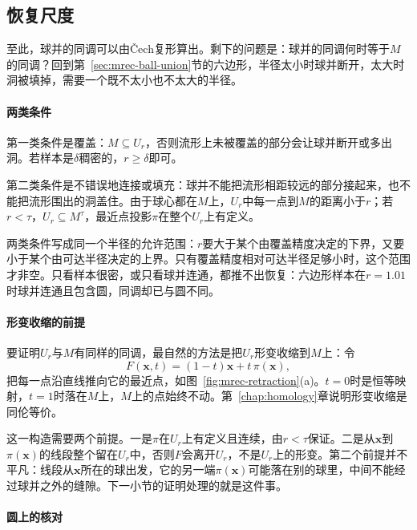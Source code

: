 \subsection{恢复尺度}
\label{sec:mrec-recovery-scale}

至此，球并的同调可以由Čech复形算出。剩下的问题是：球并的同调何时等于$M$的同调？回到第~\ref{sec:mrec-ball-union}节的六边形，半径太小时球并断开，太大时洞被填掉，需要一个既不太小也不太大的半径。

\paragraph{两类条件}

第一类条件是覆盖：$M\subseteq U_r$，否则流形上未被覆盖的部分会让球并断开或多出洞。若样本是$\delta$稠密的，$r\geq\delta$即可。

第二类条件是不错误地连接或填充：球并不能把流形相距较远的部分接起来，也不能把流形围出的洞盖住。由于球心都在$M$上，$U_r$中每一点到$M$的距离小于$r$；若$r<\tau$，$U_r\subseteq M^\tau$，最近点投影$\pi$在整个$U_r$上有定义。

两类条件写成同一个半径的允许范围：$r$要大于某个由覆盖精度决定的下界，又要小于某个由可达半径决定的上界。只有覆盖精度相对可达半径足够小时，这个范围才非空。只看样本很密，或只看球并连通，都推不出恢复：六边形样本在$r=1.01$时球并连通且包含圆，同调却已与圆不同。

\paragraph{形变收缩的前提}

要证明$U_r$与$M$有同样的同调，最自然的方法是把$U_r$形变收缩到$M$上：令
\begin{equation}
 F(\bm x,t)=(1-t)\bm x+t\,\pi(\bm x),
 \label{eq:mrec-retraction}
\end{equation}
把每一点沿直线推向它的最近点，如图~\ref{fig:mrec-retraction}(a)。$t=0$时是恒等映射，$t=1$时落在$M$上，$M$上的点始终不动。第~\ref{chap:homology}章说明形变收缩是同伦等价。

这一构造需要两个前提。一是$\pi$在$U_r$上有定义且连续，由$r<\tau$保证。二是从$\bm x$到$\pi(\bm x)$的线段整个留在$U_r$中，否则$F$会离开$U_r$，不是$U_r$上的形变。第二个前提并不平凡：线段从$\bm x$所在的球出发，它的另一端$\pi(\bm x)$可能落在别的球里，中间不能经过球并之外的缝隙。下一小节的证明处理的就是这件事。

\paragraph{圆上的核对}


